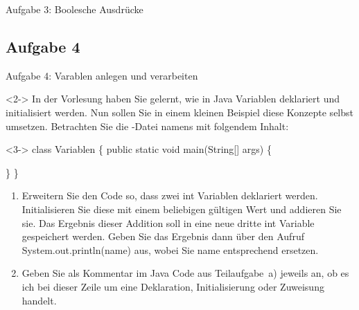 {\begin{frame}[fragile]{Aufgabe 3: Boolesche Ausdrücke}
\end{frame}
}

\subsection{Aufgabe 4}
\begin{frame}[fragile]{Aufgabe 4: Varablen anlegen und verarbeiten}
    \begin{taskblock}<2->
        In der Vorlesung haben Sie gelernt, wie in Java Variablen deklariert und initialisiert werden. Nun sollen Sie in einem kleinen Beispiel diese Konzepte selbst umsetzen. Betrachten Sie die -Datei namens  mit folgendem Inhalt:\smallskip\begin{uncoverenv}<3->
\begingroup\subdue
class Variablen \{
    public static void main(String[] args) \{

    \}
\}\smallskip
\endgroup
\end{uncoverenv}
\begin{enumerate}
    \itemsep6pt
    \item<4-> Erweitern Sie den Code so, dass zwei int Variablen deklariert werden. Initialisieren Sie diese \only<6->{\expandafter\textbf}{anschließend} mit
    einem beliebigen gültigen Wert und addieren Sie sie. Das Ergebnis dieser Addition soll in eine neue dritte int
    Variable gespeichert werden. Geben Sie das Ergebnis dann über den Aufruf System.out.println(name) aus,
    wobei Sie name entsprechend ersetzen.
    \item<5-> Geben Sie als Kommentar im Java Code aus Teilaufgabe~a) jeweils an, ob es ich bei dieser Zeile um eine Deklaration, Initialisierung oder Zuweisung handelt.
\end{enumerate}
\end{taskblock}
\end{frame}

